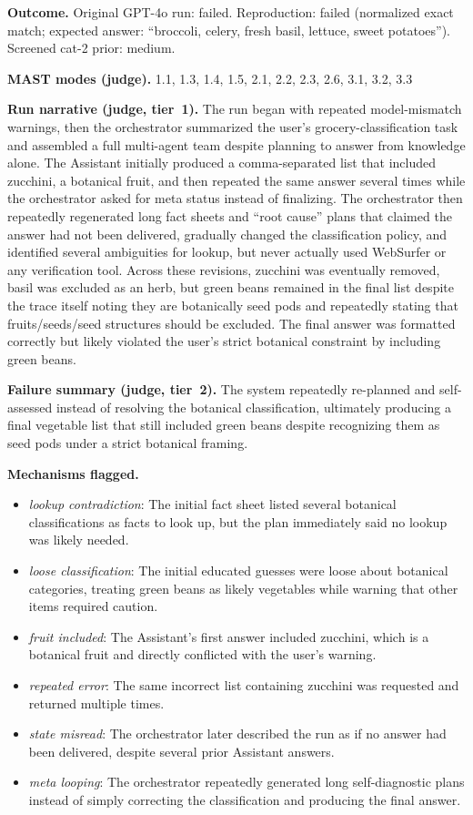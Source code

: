\textbf{Outcome.} Original GPT-4o run: failed. Reproduction: failed (normalized exact match; expected answer: ``broccoli, celery, fresh basil, lettuce, sweet potatoes''). Screened cat-2 prior: medium.

\textbf{MAST modes (judge).} 1.1, 1.3, 1.4, 1.5, 2.1, 2.2, 2.3, 2.6, 3.1, 3.2, 3.3

\textbf{Run narrative (judge, tier~1).} The run began with repeated model-mismatch warnings, then the orchestrator summarized the user's grocery-classification task and assembled a full multi-agent team despite planning to answer from knowledge alone. The Assistant initially produced a comma-separated list that included zucchini, a botanical fruit, and then repeated the same answer several times while the orchestrator asked for meta status instead of finalizing. The orchestrator then repeatedly regenerated long fact sheets and ``root cause'' plans that claimed the answer had not been delivered, gradually changed the classification policy, and identified several ambiguities for lookup, but never actually used WebSurfer or any verification tool. Across these revisions, zucchini was eventually removed, basil was excluded as an herb, but green beans remained in the final list despite the trace itself noting they are botanically seed pods and repeatedly stating that fruits/seeds/seed structures should be excluded. The final answer was formatted correctly but likely violated the user's strict botanical constraint by including green beans.

\textbf{Failure summary (judge, tier~2).} The system repeatedly re-planned and self-assessed instead of resolving the botanical classification, ultimately producing a final vegetable list that still included green beans despite recognizing them as seed pods under a strict botanical framing.

\textbf{Mechanisms flagged.}
\begin{itemize}
  \item \emph{lookup contradiction}: The initial fact sheet listed several botanical classifications as facts to look up, but the plan immediately said no lookup was likely needed.
  \item \emph{loose classification}: The initial educated guesses were loose about botanical categories, treating green beans as likely vegetables while warning that other items required caution.
  \item \emph{fruit included}: The Assistant's first answer included zucchini, which is a botanical fruit and directly conflicted with the user's warning.
  \item \emph{repeated error}: The same incorrect list containing zucchini was requested and returned multiple times.
  \item \emph{state misread}: The orchestrator later described the run as if no answer had been delivered, despite several prior Assistant answers.
  \item \emph{meta looping}: The orchestrator repeatedly generated long self-diagnostic plans instead of simply correcting the classification and producing the final answer.
\end{itemize}

